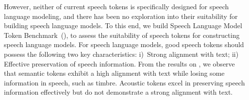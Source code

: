 However, neither of current speech tokens is specifically designed for speech language modeling, and there has been no exploration into their suitability for building speech language models.
To this end, we build Speech Language Model Token Benchmark~(\bench), to assess the suitability of speech tokens for constructing speech language models.
For speech language models, good speech tokens should possess the following two key characteristics: i)~Strong alignment with text; ii) Effective preservation of speech information. From the results on \bench, we observe that semantic tokens exhibit a high alignment with text while losing some information in speech, such as timbre. Acoustic tokens excel in preserving speech information effectively but do not demonstrate a strong alignment with text.


